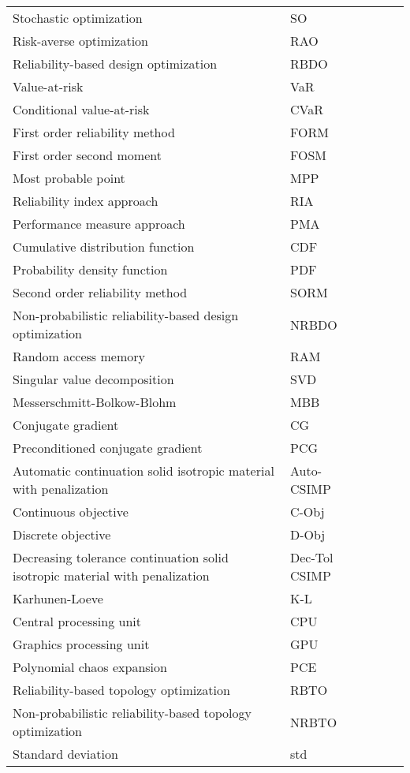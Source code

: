 {\begin{longtable}{lp{4cm}lp{3cm}l}
	    Stochastic optimization & SO \\
	    Risk-averse optimization & RAO \\
	    Reliability-based design optimization & RBDO \\
	    Value-at-risk & VaR \\
	    Conditional value-at-risk & CVaR \\
	    First order reliability method & FORM \\
	    First order second moment & FOSM \\
	    Most probable point & MPP \\
	    Reliability index approach & RIA \\
	    Performance measure approach & PMA \\
	    Cumulative distribution function & CDF \\
	    Probability density function & PDF \\
	    Second order reliability method & SORM \\
	    Non-probabilistic reliability-based design optimization & NRBDO \\
	    Random access memory & RAM \\
	    Singular value decomposition & SVD \\
	    Messerschmitt-Bolkow-Blohm & MBB \\
	    Conjugate gradient & CG \\
	    Preconditioned conjugate gradient & PCG \\
	    Automatic continuation solid isotropic material with penalization & Auto-CSIMP \\
	    Continuous objective & C-Obj \\
	    Discrete objective & D-Obj \\
	    Decreasing tolerance continuation solid isotropic material with penalization & Dec-Tol CSIMP \\
	    Karhunen-Loeve & K-L \\
	    Central processing unit & CPU \\
	    Graphics processing unit & GPU \\
	    Polynomial chaos expansion & PCE \\
	    Reliability-based topology optimization & RBTO \\
	    Non-probabilistic reliability-based topology optimization & NRBTO \\
	    Standard deviation & std
	\end{longtable}
}

\clearpage
